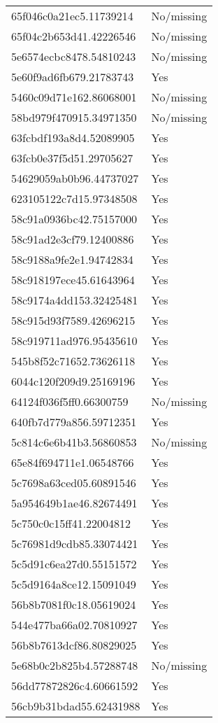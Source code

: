 \begin{tabular}{ll}
65f046c0a21ec5.11739214 & No/missing \\
65f04c2b653d41.42226546 & No/missing \\
5e6574ecbc8478.54810243 & No/missing \\
5e60f9ad6fb679.21783743 & Yes \\
5460c09d71e162.86068001 & No/missing \\
58bd979f470915.34971350 & No/missing \\
63fcbdf193a8d4.52089905 & Yes \\
63fcb0e37f5d51.29705627 & Yes \\
54629059ab0b96.44737027 & Yes \\
623105122c7d15.97348508 & Yes \\
58c91a0936bc42.75157000 & Yes \\
58c91ad2e3cf79.12400886 & Yes \\
58c9188a9fe2e1.94742834 & Yes \\
58c918197ece45.61643964 & Yes \\
58c9174a4dd153.32425481 & Yes \\
58c915d93f7589.42696215 & Yes \\
58c919711ad976.95435610 & Yes \\
545b8f52c71652.73626118 & Yes \\
6044c120f209d9.25169196 & Yes \\
64124f036f5ff0.66300759 & No/missing \\
640fb7d779a856.59712351 & Yes \\
5c814c6e6b41b3.56860853 & No/missing \\
65e84f694711e1.06548766 & Yes \\
5c7698a63ced05.60891546 & Yes \\
5a954649b1ae46.82674491 & Yes \\
5c750c0c15ff41.22004812 & Yes \\
5c76981d9cdb85.33074421 & Yes \\
5c5d91c6ea27d0.55151572 & Yes \\
5c5d9164a8ce12.15091049 & Yes \\
56b8b7081f0c18.05619024 & Yes \\
544e477ba66a02.70810927 & Yes \\
56b8b7613dcf86.80829025 & Yes \\
5e68b0c2b825b4.57288748 & No/missing \\
56dd77872826c4.60661592 & Yes \\
56cb9b31bdad55.62431988 & Yes \\

\end{tabular}
